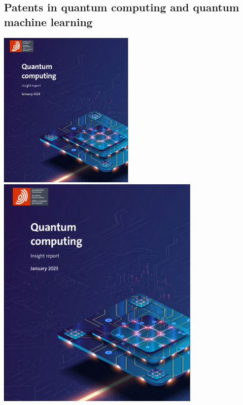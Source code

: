 \subsection{Patents in quantum computing and quantum machine learning}
\begin{frame}[allowframebreaks]{}
    \centering
    \includegraphics[width=0.5\textwidth, page=1]{pics/introduction/patents.pdf}\\
    \includegraphics[width=0.75\textwidth, page=2]{pics/introduction/patents.pdf}\\

\end{frame}
